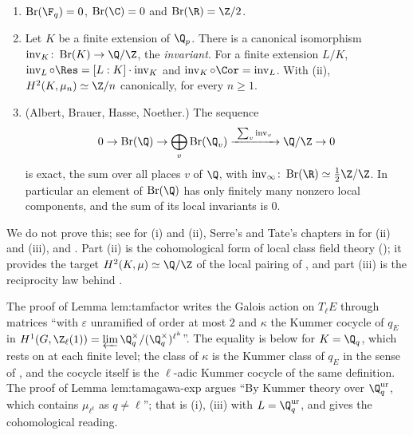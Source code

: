 \begin{theorem}\label{thm:galcoh:brauer}
\begin{enumerate}[label=(\roman*)]
\item $\operatorname{Br}(\F_q)=0$, $\operatorname{Br}(\C)=0$ and $\operatorname{Br}(\R)=\Z/2$.
\item Let $K$ be a finite extension of $\Q_p$. There is a canonical isomorphism $\operatorname{inv}_K\colon\operatorname{Br}(K)\to\Q/\Z$, the \emph{invariant}. For a finite
extension $L/K$, $\operatorname{inv}_L\circ\Res=[L:K]\cdot\operatorname{inv}_K$ and $\operatorname{inv}_K\circ\Cor=\operatorname{inv}_L$. With (ii),
$H^2(K,\mu_n)\simeq\Z/n$ canonically, for every $n\ge1$.
\item (Albert, Brauer, Hasse, Noether.) The sequence
\[
0\to\operatorname{Br}(\Q)\to\bigoplus_v\operatorname{Br}(\Q_v)\xrightarrow{\ \sum_v\operatorname{inv}_v\ }\Q/\Z\to0
\]
is exact, the sum over all places $v$ of $\Q$, with $\operatorname{inv}_\infty\colon\operatorname{Br}(\R)\simeq\tfrac12\Z/\Z$. In particular an element of $\operatorname{Br}(\Q)$
has only finitely many nonzero local components, and the sum of its local invariants is $0$.
\end{enumerate}
\end{theorem}

\noindent We do not prove this; see \cite[Chapters X, XII and XIII]{SerreLocalFields} for (i) and (ii), Serre's and Tate's chapters in
\cite[Chapters VI and VII]{CasselsFrohlich} for (ii) and (iii), and \cite[Chapter II, Section 5]{SerreGaloisCoh}. Part (ii) is the cohomological form of local class
field theory (); it provides the target $H^2(K,\mu)\simeq\Q/\Z$ of the local pairing of , and part (iii) is the reciprocity law behind
.

\begin{paperlink}\label{pl:galcoh:kummer}
The proof of Lemma lem:tamfactor writes the Galois action on $T_\ell E$ through matrices ``with $\varepsilon$ unramified of order at most $2$ and $\kappa$ the Kummer
cocycle of $q_E$ in $H^1(G,\Z_\ell(1))=\varprojlim\Q_q^\times/(\Q_q^\times)^{\ell^k}$''. The equality is  below for $K=\Q_q$, which
rests on  at each finite level; the class of $\kappa$ is the Kummer class of $q_E$ in the sense of , and the
cocycle itself is the $\ell$-adic Kummer cocycle of the same definition. The proof of Lemma lem:tamagawa-exp argues ``By Kummer theory over
$\Q_q^{\mathrm{ur}}$, which contains $\mu_{\ell^t}$ as $q\ne\ell$''; that is (i), (iii) with $L=\Q_q^{\mathrm{ur}}$, and
 gives the cohomological reading.
\end{paperlink}

